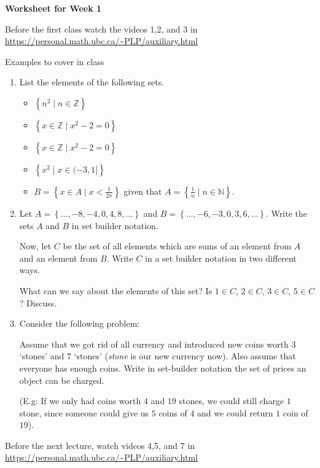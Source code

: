 \documentclass[12pt]{article}
\newcommand{\set}[1]{\left\{ #1 \right\}}
\begin{document}
\centerline{\bf\large Worksheet for Week 1}

\vspace{25pt}

Before the first class watch the videos 1,2, and 3 in \url{https://personal.math.ubc.ca/~PLP/auxiliary.html}

Examples to cover in class

\begin{enumerate}

\item List the elements of the following sets.

\begin{itemize}

\item $\set{n^2 \mid n\in\mathbb Z}$

\item $\set{x\in\mathbb Z \mid x^2-2=0}$

\item $\set{x\in\mathbb Z \mid x^2-2=0}$

\item $\set{x^2\mid x\in (-3, 1]}$

\item $B=\set{x\in A\mid x<\frac{1}{2\pi}}$ given that  $A=\set{\frac{1}{n}\mid n\in\mathbb N}$.

\end{itemize}


\item  Let $A=\set{\ldots, -8, -4, 0, 4, 8, \ldots}$ and $B=\set{\ldots, -6, -3, 0, 3, 6, \ldots}$.  Write the sets $A$ and $B$ in set builder notation.

Now, let $C$ be the set of all elements which are sums of an element from  $A$ and an element from $B$. Write $C$ in a set builder notation in two different ways.

What can we say about the elements of this set? Is $1\in C$, $2\in C$, $3\in C$, $5\in C$? Discuss.

\item Consider the following problem:

Assume that we got rid of all currency and introduced new coins worth $3$ `stones' and $7$ `stones' ({\it stone} is our new currency now). Also assume that everyone has enough coins. Write in set-builder notation the set of prices an object can be charged.

(E.g: If we only had coins worth $4$ and $19$ stones, we could still charge $1$ stone, since someone could give us $5$ coins of $4$ and we could return $1$ coin of $19$).


\end{enumerate}

Before the next lecture, watch  videos 4,5, and 7 in \url{https://personal.math.ubc.ca/~PLP/auxiliary.html}
\end{document}
